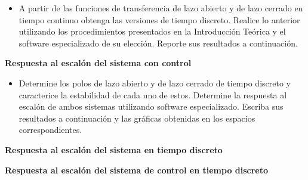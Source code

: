 \begin{itemize}
	\item A partir de las funciones de transferencia de lazo abierto y de lazo cerrado en tiempo continuo obtenga las versiones de tiempo discreto. Realice lo anterior utilizando los procedimientos presentados en la
	Introducción Teórica y el software especializado de su elección. Reporte sus resultados a continuación.
\end{itemize}

\textbf{Respuesta al escalón del sistema con control}

\begin{itemize}
	\item Determine los polos de lazo abierto y de lazo cerrado de tiempo discreto y caracterice la estabilidad de
	cada uno de estos. Determine la respuesta al escalón de ambos sistemas utilizando software especializado.
	Escriba sus resultados a continuación y las gráficas obtenidas en los espacios correspondientes.
\end{itemize}

\textbf{Respuesta al escalón del sistema en tiempo discreto}

\textbf{Respuesta al escalón del sistema de control en tiempo discreto}